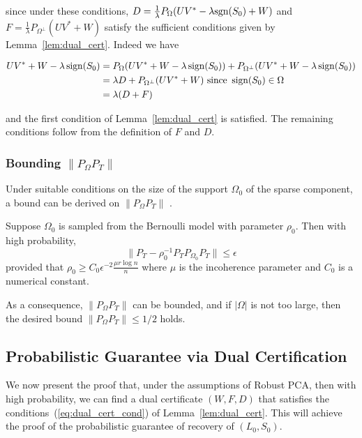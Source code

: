 since under these conditions, $D = \frac{1}{\lambda} P_\Omega (UV^* - \lambda \text{sgn}(S_0) + W)$ and $F = \frac{1}{\lambda} P_{\Omega^\perp} (UV^* + W)$ satisfy the sufficient conditions given by Lemma~\ref{lem:dual_cert}. Indeed we have

\begin{align*}
UV^* + W - \lambda \operatorname{sign}(S_0)
&= P_\Omega (UV^* + W - \lambda \operatorname{sign}(S_0))+ P_{\Omega^\perp} (UV^* + W - \lambda \operatorname{sign}(S_0)) \\
&= \lambda D+ P_{\Omega^\perp} (UV^* + W) \text{ since } \operatorname{sign}(S_0) \in \Omega\\
&= \lambda (D+F)
\end{align*}

and the first condition of Lemma~\ref{lem:dual_cert} is satisfied. The remaining conditions follow from the definition of $F$ and $D$.
\fi

\subsubsection{Bounding $\|P_\Omega P_T\|$}
 Under suitable conditions on the size of the support $\Omega_0$ of the sparse component, a bound can be derived on  $\|P_\Omega P_T\|$ \cite{Candes:2009uq}.
\begin{theorem}
Suppose $\Omega_0$ is sampled from the Bernoulli model with parameter $\rho_0$. Then with high probability,
\[
\|P_T - \rho_0^{-1} P_T P_{\Omega_0} P_T\| \leq \epsilon
\]
provided that $\rho_0 \geq C_0 \epsilon^{-2} \frac{\mu r \log n}{n}$ where $\mu$ is the incoherence parameter and $C_0$ is a numerical constant.
\end{theorem}

As a consequence, $\|P_\Omega P_T\|$ can be bounded, and if $|\Omega|$ is not too large, then the desired bound $\|P_\Omega P_T\| \leq 1/2$ holds.

\subsection{Probabilistic Guarantee via Dual Certification}

We now present the proof that, under the assumptions of Robust PCA, then with high probability, we can find a dual certificate $(W,F,D)$ that satisfies the conditions~(\ref{eq:dual_cert_cond}) of Lemma~\ref{lem:dual_cert}. This will achieve the proof of the probabilistic guarantee of recovery of $(L_0, S_0)$.

